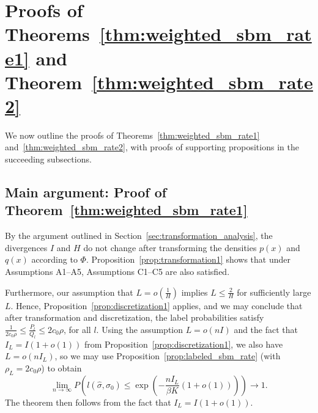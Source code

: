 \documentclass{article}
\begin{document}

\section{Proofs of Theorems~\ref{thm:weighted_sbm_rate1} and Theorem~\ref{thm:weighted_sbm_rate2}}
\label{sec:transformation_proof}

We now outline the proofs of Theorems~\ref{thm:weighted_sbm_rate1} and~\ref{thm:weighted_sbm_rate2}, with proofs of supporting propositions in the succeeding subsections.

\subsection{Main argument: Proof of Theorem~\ref{thm:weighted_sbm_rate1}}
\label{AppThmRate1}

By the argument outlined in Section~\ref{sec:transformation_analysis}, the divergences $I$ and $H$ do not change after transforming the densities $p(x)$ and $q(x)$ according to $\Phi$. 
Proposition~\ref{prop:transformation1} shows that under Assumptions A1--A5, Assumptions C1--C5 are also satisfied.

Furthermore, our assumption that $L = o(\frac{1}{H})$ implies $L \leq \frac{2}{H}$ for sufficiently large $L$. Hence, Proposition~\ref{prop:discretization1} applies, and we may conclude that after transformation and discretization, the label probabilities satisfy $\frac{1}{2c_0 \rho} \leq \frac{P_l}{Q_l} \leq 2c_0 \rho$, for all $l$. Using the assumption $L = o(nI)$ and the fact that $I_L = I (1 + o(1))$ from Proposition~\ref{prop:discretization1}, we also have $L = o(n I_L)$, so we may use Proposition~\ref{prop:labeled_sbm_rate} (with $\rho_L = 2 c_0 \rho$) to obtain
\[
\lim_{n \rightarrow \infty} P \left( l(\hat{\sigma}, \sigma_0) \leq \exp \left( - \frac{ n I_L}{ \beta K} (1 + o(1)) \right) \right) \rightarrow 1.
\]
The theorem then follows from the fact that $I_L = I(1+o(1))$. 
\end{document}
